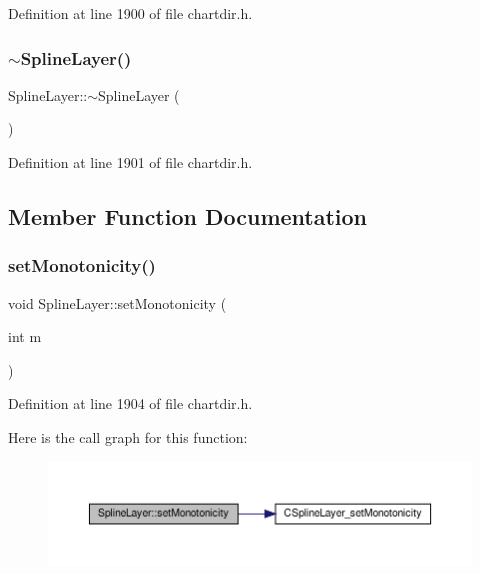 Definition at line 1900 of file chartdir.\+h.

\mbox{\label{class_spline_layer_a3c0b391ce5957b83b00538c079e39c83}} 
\subsubsection{\texorpdfstring{$\sim$\+Spline\+Layer()}{~SplineLayer()}}
{\footnotesize\ttfamily Spline\+Layer\+::$\sim$\+Spline\+Layer (\begin{DoxyParamCaption}{ }\end{DoxyParamCaption})\hspace{0.3cm}{\ttfamily [inline]}}



Definition at line 1901 of file chartdir.\+h.



\subsection{Member Function Documentation}
\mbox{\label{class_spline_layer_aa829ae59416c115940c509ab42de74d2}} 
\subsubsection{\texorpdfstring{set\+Monotonicity()}{setMonotonicity()}}
{\footnotesize\ttfamily void Spline\+Layer\+::set\+Monotonicity (\begin{DoxyParamCaption}\item[{int}]{m }\end{DoxyParamCaption})\hspace{0.3cm}{\ttfamily [inline]}}



Definition at line 1904 of file chartdir.\+h.

Here is the call graph for this function\+:
\nopagebreak
\begin{figure}[H]
\begin{center}
\leavevmode
\includegraphics[width=350pt]{class_spline_layer_aa829ae59416c115940c509ab42de74d2_cgraph}
\end{center}
\end{figure}
\mbox{\label{class_spline_layer_a1bea981af7bfba2930af1a0ee543b348}} 
